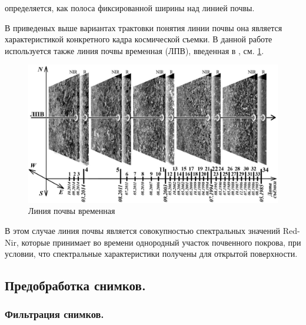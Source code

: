 \documentclass[14pt]{extarticle}
\begin{document}
определяется, как полоса фиксированной ширины над линией почвы.
\par
В приведеных выше вариантах трактовки понятия линии почвы она является характеристикой
конкретного кадра космической съемки. В данной работе используется также линия почвы 
временная (ЛПВ), введенная в \cite{rukhovich-1}, см. \ref{image:soil_line_time}. 
\begin{figure}[H]
\centering
\includegraphics[width=\linewidth]{imgs/soil_line_time.png}
\caption{Линия почвы временная}
\label{image:soil_line_time}
\end{figure}
В этом случае линия почвы является совокупностью спектральных значений Red-Nir,
которые принимает во времени однородный участок почвенного покрова, при условии, что
спектральные характеристики получены для открытой поверхности.

\subsection{Предобработка снимков.}

\subsubsection{Фильтрация снимков.}
\end{document}
